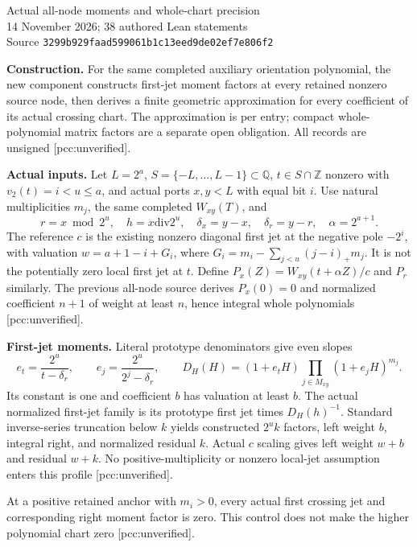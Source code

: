 \documentclass[10pt]{article}
\begin{document}
\begin{center}
{\Large Actual all-node moments and whole-chart precision}\\[4pt]
14 November 2026; 38 authored Lean statements\\
Source \texttt{3299b929faad599061b1c13eed9de02ef7e806f2}
\end{center}
\textbf{Construction.} For the same completed auxiliary orientation polynomial,
the new component constructs first-jet moment factors at every retained
nonzero source node, then derives a finite geometric approximation for every
coefficient of its actual crossing chart. The approximation is per entry;
compact whole-polynomial matrix factors are a separate open obligation.
All records are unsigned [pcc:unverified].

\textbf{Actual inputs.} Let $L=2^a$, $S=\{-L,\ldots,L-1\}\subset\mathbb Q$,
$t\in S\cap\mathbb Z$ nonzero with $v_2(t)=i<u\le a$, and actual ports
$x,y<L$ with equal bit $i$. Use natural multiplicities $m_j$, the same
completed $W_{xy}(T)$, and
\[
 r=x\bmod2^u,\quad h=x\mathbin{\mathrm{div}}2^u,\quad
 \delta_x=y-x,\quad\delta_r=y-r,\quad\alpha=2^{a+1}.
\]
The reference $c$ is the existing nonzero diagonal first jet at the negative
pole $-2^i$, with valuation $w=a+1-i+G_i$, where
$G_i=m_i-\sum_{j<u}(j-i)_+m_j$. It is not the potentially zero local
first jet at $t$. Define $P_x(Z)=W_{xy}(t+\alpha Z)/c$ and $P_r$ similarly.
The previous all-node source derives $P_x(0)=0$ and normalized coefficient
$n+1$ of weight at least $n$, hence integral whole polynomials
[pcc:unverified].

\textbf{First-jet moments.} Literal prototype denominators give even slopes
\[
 e_t=\frac{2^u}{t-\delta_r},\qquad e_j=\frac{2^u}{2^j-\delta_r},\qquad
 D_H(H)=(1+e_tH)\prod_{j\in M_{xy}}(1+e_jH)^{m_j}.
\]
Its constant is one and coefficient $b$ has valuation at least $b$.
The actual normalized first-jet family is its prototype first jet times
$D_H(h)^{-1}$. Standard inverse-series truncation below $k$ yields constructed
$2^u k$ factors, left weight $b$, integral right, and normalized residual
$k$. Actual $c$ scaling gives left weight $w+b$ and residual $w+k$.
No positive-multiplicity or nonzero local-jet assumption enters this profile
[pcc:unverified].

At a positive retained anchor with $m_i>0$, every actual first crossing jet
and corresponding right moment factor is zero. This control does not make
the higher polynomial chart zero [pcc:unverified].
\end{document}
